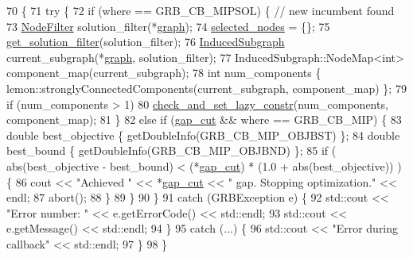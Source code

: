 \begin{DoxyCode}
70                                       \{
71     \textcolor{keywordflow}{try} \{
72         \textcolor{keywordflow}{if} (where == GRB\_CB\_MIPSOL) \{ \textcolor{comment}{// new incumbent found}
73             \hyperlink{namespacederegnet_a50db1f8fc7c6a954d825d9e1ed9ad302}{NodeFilter} solution\_filter(*\hyperlink{classderegnet_1_1LazyConstraintCallback_af481c9d68dea2dab035e1f2f79cda4d5}{graph});
74             \hyperlink{classderegnet_1_1LazyConstraintCallback_a5ddc4662e6e5c9f1d191c15edbefaa9b}{selected\_nodes} = \{\};
75             \hyperlink{classderegnet_1_1LazyConstraintCallback_aebc9854e98523c99d3f856ff71bb86fb}{get\_solution\_filter}(solution\_filter);
76             \hyperlink{namespacederegnet_ad1e0ad2af7b91e41fc1d8a15a1da5041}{InducedSubgraph} current\_subgraph(*\hyperlink{classderegnet_1_1LazyConstraintCallback_af481c9d68dea2dab035e1f2f79cda4d5}{graph}, solution\_filter);
77             InducedSubgraph::NodeMap<int> component\_map(current\_subgraph);
78             \textcolor{keywordtype}{int} num\_components \{ lemon::stronglyConnectedComponents(current\_subgraph, component\_map) \};
79             \textcolor{keywordflow}{if} (num\_components > 1)
80                 \hyperlink{classderegnet_1_1LazyConstraintCallback_a02eb39d4ea843597aa7c3382f17af874}{check\_and\_set\_lazy\_constr}(num\_components, component\_map);
81         \}
82         \textcolor{keywordflow}{else} \textcolor{keywordflow}{if} (\hyperlink{classderegnet_1_1LazyConstraintCallback_a6a139307165523fa944e393e01aeec47}{gap\_cut} && where == GRB\_CB\_MIP) \{
83             \textcolor{keywordtype}{double} best\_objective \{ getDoubleInfo(GRB\_CB\_MIP\_OBJBST) \};
84             \textcolor{keywordtype}{double} best\_bound \{ getDoubleInfo(GRB\_CB\_MIP\_OBJBND) \};
85             \textcolor{keywordflow}{if} ( abs(best\_objective - best\_bound) < (*\hyperlink{classderegnet_1_1LazyConstraintCallback_a6a139307165523fa944e393e01aeec47}{gap\_cut}) * (1.0 + abs(best\_objective)) ) \{
86                 cout << \textcolor{stringliteral}{"Achieved "} << *\hyperlink{classderegnet_1_1LazyConstraintCallback_a6a139307165523fa944e393e01aeec47}{gap\_cut} << \textcolor{stringliteral}{" gap. Stopping optimization."} << endl;
87                 abort();
88             \}
89         \}
90     \}
91     \textcolor{keywordflow}{catch} (GRBException e) \{
92         std::cout << \textcolor{stringliteral}{"Error number: "} << e.getErrorCode() << std::endl;
93         std::cout << e.getMessage() << std::endl;
94     \}
95     \textcolor{keywordflow}{catch} (...) \{
96         std::cout << \textcolor{stringliteral}{"Error during callback"} << std::endl;
97     \}
98 \}
\end{DoxyCode}


